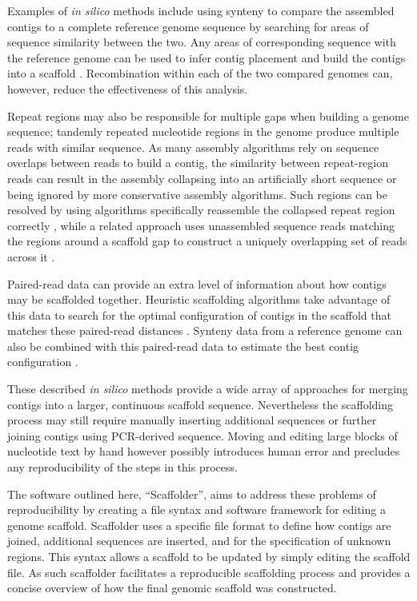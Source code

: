 \documentclass[10pt]{bmc_article}
\newenvironment{bmcformat}{\begin{raggedright}\baselineskip20pt\sloppy\setboolean{publ}{false}}{\end{raggedright}\baselineskip20pt\sloppy}
\begin{document}
\begin{bmcformat}
Examples of \emph{in silico} methods include using synteny to compare the
assembled contigs to a complete reference genome sequence by searching for
areas of sequence similarity between the two. Any areas of corresponding
sequence with the reference genome can be used to infer contig placement and
build the contigs into a scaffold \cite{richter2007,zhao2008,assefa2009}.
Recombination within each of the two compared genomes can, however, reduce the
effectiveness of this analysis. \pb

Repeat regions may also be responsible for multiple gaps when building
a genome sequence; tandemly repeated nucleotide regions in the genome produce
multiple reads with similar sequence. As many assembly algorithms rely on
sequence overlaps between reads to build a contig, the similarity between
repeat-region reads can result in the assembly collapsing into an artificially
short sequence or being ignored by more conservative assembly algorithms. Such
regions can be resolved by using algorithms specifically reassemble the
collapsed repeat region correctly \cite{mulyukov2002,koren2010}, while
a related approach uses unassembled sequence reads matching the regions around
a scaffold gap to construct a uniquely overlapping set of reads across it
\cite{tsai2010}. \pb

Paired-read data can provide an extra level of information about how contigs
may be scaffolded together. Heuristic scaffolding algorithms take advantage of
this data to search for the optimal configuration of contigs in the scaffold
that matches these paired-read distances \cite{dayarian2010,boetzer2011}.
Synteny data from a reference genome can also be combined with this
paired-read data to estimate the best contig configuration \cite{pop2004}. \pb

These described \emph{in silico} methods provide a wide array of approaches
for merging contigs into a larger, continuous scaffold sequence. Nevertheless
the scaffolding process may still require manually inserting additional
sequences or further joining contigs using PCR-derived sequence. Moving and
editing large blocks of nucleotide text by hand however possibly introduces
human error and precludes any reproducibility of the steps in this process. \pb

The software outlined here, ``Scaffolder'', aims to address these problems of
reproducibility by creating a file syntax and software framework for editing
a genome scaffold. Scaffolder uses a specific file format to define how contigs
are joined, additional sequences are inserted, and for the specification of
unknown regions. This syntax allows a scaffold to be updated by simply editing
the scaffold file. As such scaffolder facilitates a reproducible scaffolding
process and provides a concise overview of how the final genomic scaffold was
constructed. \pb


\end{bmcformat}
\end{document}
